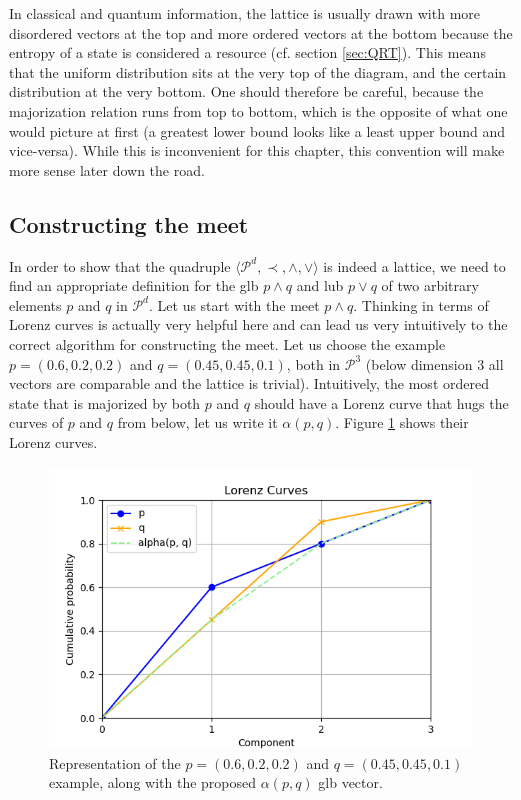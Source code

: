 In classical and quantum information, the lattice is usually drawn with more disordered vectors at the top and more ordered vectors at the bottom because the entropy of a state is considered a resource (cf. section \ref{sec:QRT}). This means that the uniform distribution sits at the very top of the diagram, and the certain distribution at the very bottom. One should therefore be careful, because the majorization relation runs from top to bottom, which is the opposite of what one would picture at first (a greatest lower bound looks like a least upper bound and vice-versa). While this is inconvenient for this chapter, this convention will make more sense later down the road.



\subsection{Constructing the meet} \label{sec:meet}

In order to show that the quadruple $\langle \mathcal{P}^d, \prec, \wedge, \vee \rangle$ is indeed a lattice, we need to find an appropriate definition for the glb $p \wedge q$ and lub $p \vee q$ of two arbitrary elements $p$ and $q$ in $\mathcal{P}^d$. Let us start with the meet $p \wedge q$. Thinking in terms of Lorenz curves is actually very helpful here and can lead us very intuitively to the correct algorithm for constructing the meet. Let us choose the example $p = (0.6, 0.2, 0.2)$ and $q = (0.45, 0.45, 0.1)$, both in $\mathcal{P}^3$ (below dimension 3 all vectors are comparable and the lattice is trivial). Intuitively, the most ordered state that is majorized by both $p$ and $q$ should have a Lorenz curve that hugs the curves of $p$ and $q$ from below, let us write it $\alpha(p, q)$. Figure \ref{fig:meet_attempt} shows their Lorenz curves.

\begin{figure}[h!]
    \centering
    \includegraphics[scale=0.6]{images/meet_intuition.png}
    \caption{Representation of the $p = (0.6, 0.2, 0.2)$ and $q = (0.45, 0.45, 0.1)$ example, along with the proposed $\alpha(p, q)$ glb vector.} \label{fig:meet_attempt}
\end{figure}

